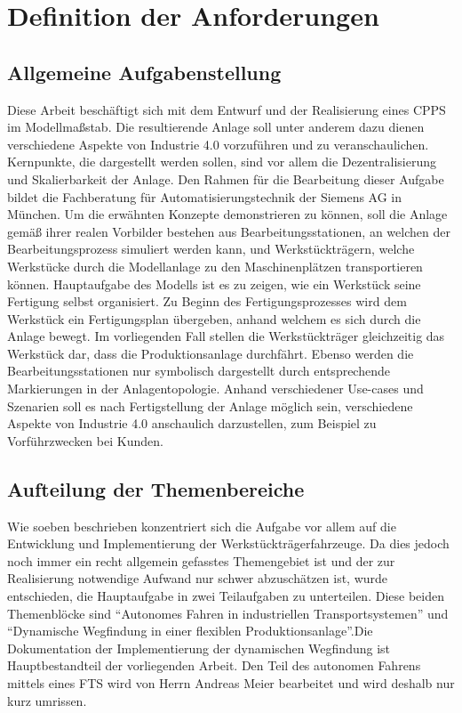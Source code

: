 \chapter{Definition der Anforderungen}

\section{Allgemeine Aufgabenstellung}

	Diese Arbeit beschäftigt sich mit dem Entwurf und der Realisierung eines \ac{CPPS} im Modellmaßstab. Die resultierende Anlage soll unter anderem dazu dienen verschiedene Aspekte von Industrie 4.0 vorzuführen und zu veranschaulichen. Kernpunkte, die dargestellt werden sollen, sind vor allem die Dezentralisierung und Skalierbarkeit der Anlage. Den Rahmen für die Bearbeitung dieser Aufgabe bildet die Fachberatung für Automatisierungstechnik der Siemens AG in München. Um die erwähnten Konzepte demonstrieren zu können, soll die Anlage gemäß ihrer realen Vorbilder bestehen aus Bearbeitungsstationen, an welchen der Bearbeitungsprozess simuliert werden kann, und Werkstückträgern, welche Werkstücke durch die Modellanlage zu den Maschinenplätzen transportieren können. Hauptaufgabe des Modells ist es zu zeigen, wie ein Werkstück seine Fertigung selbst organisiert. Zu Beginn des Fertigungsprozesses wird dem Werkstück ein Fertigungsplan übergeben, anhand welchem es sich durch die Anlage bewegt. Im vorliegenden Fall stellen die Werkstückträger gleichzeitig das Werkstück dar, dass die Produktionsanlage durchfährt. Ebenso werden die Bearbeitungsstationen nur symbolisch dargestellt durch entsprechende Markierungen in der Anlagentopologie. Anhand verschiedener Use-cases und Szenarien soll es nach Fertigstellung der Anlage möglich sein, verschiedene Aspekte von Industrie 4.0 anschaulich darzustellen, zum Beispiel zu Vorführzwecken bei Kunden.

\section{Aufteilung der Themenbereiche}

	Wie soeben beschrieben konzentriert sich die Aufgabe vor allem auf die Entwicklung und Implementierung der Werkstückträgerfahrzeuge. Da dies jedoch noch immer ein recht allgemein gefasstes Themengebiet ist und der zur Realisierung notwendige Aufwand nur schwer abzuschätzen ist, wurde entschieden, die Hauptaufgabe in zwei Teilaufgaben zu unterteilen. Diese beiden Themenblöcke sind "`Autonomes Fahren in industriellen Transportsystemen"' und "`Dynamische Wegfindung in einer flexiblen Produktionsanlage"'\cite{I40Modell}.Die Dokumentation der Implementierung der dynamischen Wegfindung ist Hauptbestandteil der vorliegenden Arbeit. Den Teil des autonomen Fahrens mittels eines \ac{FTS} wird von Herrn Andreas Meier bearbeitet und wird deshalb nur kurz umrissen.

